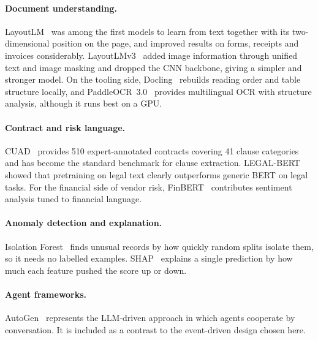 \paragraph{Document understanding.} LayoutLM~\cite{xu2020layoutlm} was among the first models to learn from text together with its two-dimensional position on the page, and improved results on forms, receipts and invoices considerably. LayoutLMv3~\cite{huang2022layoutlmv3} added image information through unified text and image masking and dropped the CNN backbone, giving a simpler and stronger model. On the tooling side, Docling~\cite{auer2024docling} rebuilds reading order and table structure locally, and PaddleOCR~3.0~\cite{cui2025paddleocr} provides multilingual OCR with structure analysis, although it runs best on a GPU.

\paragraph{Contract and risk language.} CUAD~\cite{hendrycks2021cuad} provides 510 expert-annotated contracts covering 41 clause categories and has become the standard benchmark for clause extraction. LEGAL-BERT~\cite{chalkidis2020legalbert} showed that pretraining on legal text clearly outperforms generic BERT on legal tasks. For the financial side of vendor risk, FinBERT~\cite{araci2019finbert} contributes sentiment analysis tuned to financial language.

\paragraph{Anomaly detection and explanation.} Isolation Forest~\cite{liu2008isolation} finds unusual records by how quickly random splits isolate them, so it needs no labelled examples. SHAP~\cite{lundberg2017shap} explains a single prediction by how much each feature pushed the score up or down.

\paragraph{Agent frameworks.} AutoGen~\cite{wu2023autogen} represents the LLM-driven approach in which agents cooperate by conversation. It is included as a contrast to the event-driven design chosen here.

